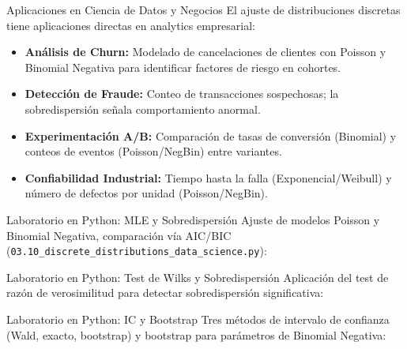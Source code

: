 \documentclass[10pt, aspectratio=169]{beamer}
\begin{document}
\begin{frame}{Aplicaciones en Ciencia de Datos y Negocios}
  \footnotesize
  El ajuste de distribuciones discretas tiene aplicaciones directas en analytics empresarial: \pause

  \vspace{0.15cm}
  \begin{itemize}\itemsep=0.12cm
    \item \textbf{Análisis de Churn:} Modelado de cancelaciones de clientes con Poisson y Binomial Negativa para identificar factores de riesgo en cohortes. \pause
    \item \textbf{Detección de Fraude:} Conteo de transacciones sospechosas; la sobredispersión señala comportamiento anormal. \pause
    \item \textbf{Experimentación A/B:} Comparación de tasas de conversión (Binomial) y conteos de eventos (Poisson/NegBin) entre variantes. \pause
    \item \textbf{Confiabilidad Industrial:} Tiempo hasta la falla (Exponencial/Weibull) y número de defectos por unidad (Poisson/NegBin).
  \end{itemize}
\end{frame}

\begin{frame}[fragile]{Laboratorio en Python: MLE y Sobredispersión}
  \scriptsize
  Ajuste de modelos Poisson y Binomial Negativa, comparación vía AIC/BIC (\texttt{03.10\_discrete\_distributions\_data\_science.py}):
  \vspace{0.02cm}
  {
  }
\end{frame}

\begin{frame}[fragile]{Laboratorio en Python: Test de Wilks y Sobredispersión}
  \scriptsize
  Aplicación del test de razón de verosimilitud para detectar sobredispersión significativa:
  \vspace{0.02cm}
  {
  }
\end{frame}

\begin{frame}[fragile]{Laboratorio en Python: IC y Bootstrap}
  \scriptsize
  Tres métodos de intervalo de confianza (Wald, exacto, bootstrap) y bootstrap para parámetros de Binomial Negativa:
  \vspace{0.02cm}
  {
  }
\end{frame}
\end{document}
